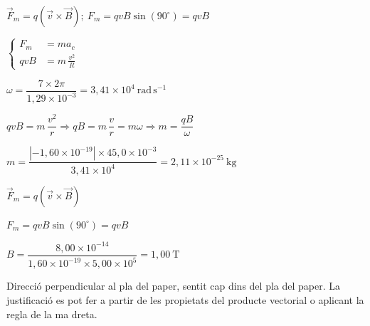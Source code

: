 \begin{solapartat}
 $\vec{F}_m = q\left(\vec{v}\times\vec{B}\right);\ F_m = qvB\sin(90^\circ) = qvB$

 $\left\{\begin{aligned} F_m &= m a_c\\ qvB &= m\,\frac{v^2}{R} \end{aligned}\right.$


 $\omega = \dfrac{7\times 2\pi}{1,29\times 10^{-3}} = 3,41\times 10^{4}\ \mathrm{rad\,s^{-1}}$

 $qvB = m\,\dfrac{v^2}{r} \Rightarrow qB = m\,\dfrac{v}{r} = m\omega \Rightarrow m = \dfrac{qB}{\omega}$

 $m = \dfrac{\left|-1,60\times 10^{-19}\right|\times 45,0\times 10^{-3}}{3,41\times 10^{4}} = 2,11\times 10^{-25}\ \mathrm{kg}$
\end{solapartat}

\begin{solapartat}
 $\vec{F}_m = q\left(\vec{v}\times\vec{B}\right)$

 $F_m = qvB\sin(90^\circ) = qvB$

 $B = \dfrac{8,00\times 10^{-14}}{1,60\times 10^{-19}\times 5,00\times 10^{5}} = 1,00\ \mathrm{T}$

 Direcció perpendicular al pla del paper, sentit cap dins del pla del paper. La justificació es pot fer a partir de les propietats del producte vectorial o aplicant la regla de la ma dreta.
\end{solapartat}
